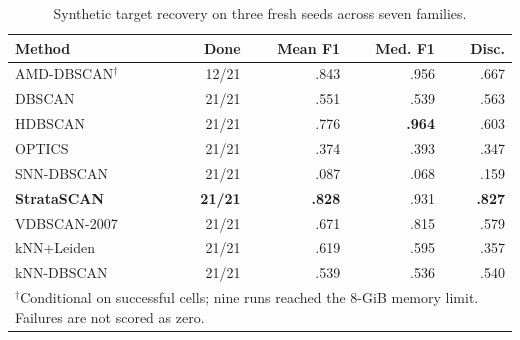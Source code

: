 \begin{table}[t]
\caption{Synthetic target recovery on three fresh seeds across seven families.}
\label{tab:synthetic_fresh}
\centering
\footnotesize
\setlength{\tabcolsep}{3.2pt}
\begin{tabular}{lrrrr}
\toprule
Method & Done & Mean F1 & Med. F1 & Disc.\\
\midrule
AMD-DBSCAN$^{\dagger}$ & 12/21 & .843 & .956 & .667\\
DBSCAN                 & 21/21 & .551 & .539 & .563\\
HDBSCAN                & 21/21 & .776 & \textbf{.964} & .603\\
OPTICS                  & 21/21 & .374 & .393 & .347\\
SNN-DBSCAN              & 21/21 & .087 & .068 & .159\\
\textbf{StrataSCAN}     & \textbf{21/21} & \textbf{.828} & .931 & \textbf{.827}\\
VDBSCAN-2007            & 21/21 & .671 & .815 & .579\\
kNN+Leiden              & 21/21 & .619 & .595 & .357\\
kNN-DBSCAN              & 21/21 & .539 & .536 & .540\\
\bottomrule
\multicolumn{5}{p{0.96\columnwidth}}{\scriptsize $^{\dagger}$Conditional on successful cells; nine runs reached the 8-GiB memory limit. Failures are not scored as zero.}
\end{tabular}
\end{table}
